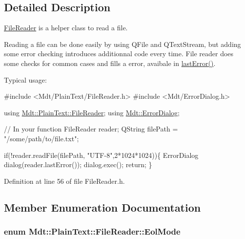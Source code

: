 \subsection{Detailed Description}
\hyperlink{class_mdt_1_1_plain_text_1_1_file_reader}{File\+Reader} is a helper class to read a file. 

Reading a file can be done easily by using Q\+File and Q\+Text\+Stream, but adding some error checking introduces additionnal code every time. File reader does some checks for common cases and fills a error, avaibale in \hyperlink{class_mdt_1_1_plain_text_1_1_file_reader_aa74ba00e8fad5c4834dc63a354416192}{last\+Error()}.

Typical usage\+: 
\begin{DoxyCode}
\textcolor{preprocessor}{#include <Mdt/PlainText/FileReader.h>}
\textcolor{preprocessor}{#include <Mdt/ErrorDialog.h>}

\textcolor{keyword}{using} \hyperlink{class_mdt_1_1_plain_text_1_1_file_reader}{Mdt::PlainText::FileReader};
\textcolor{keyword}{using} \hyperlink{class_mdt_1_1_error_dialog}{Mdt::ErrorDialog};

\textcolor{comment}{// In your function}
FileReader reader;
QString filePath = \textcolor{stringliteral}{"/some/path/to/file.txt"};

\textcolor{keywordflow}{if}(!reader.readFile(filePath, \textcolor{stringliteral}{"UTF-8"},2*1024*1024))\{
  ErrorDialog dialog(reader.lastError());
  dialog.exec();
  \textcolor{keywordflow}{return};
\}
\end{DoxyCode}
 

Definition at line 56 of file File\+Reader.\+h.



\subsection{Member Enumeration Documentation}
\subsubsection[{\texorpdfstring{Eol\+Mode}{EolMode}}]{\setlength{\rightskip}{0pt plus 5cm}enum {\bf Mdt\+::\+Plain\+Text\+::\+File\+Reader\+::\+Eol\+Mode}}\hypertarget{class_mdt_1_1_plain_text_1_1_file_reader_ad9b4b7e046f899c9d13e19434d68ef10}{}\label{class_mdt_1_1_plain_text_1_1_file_reader_ad9b4b7e046f899c9d13e19434d68ef10}


